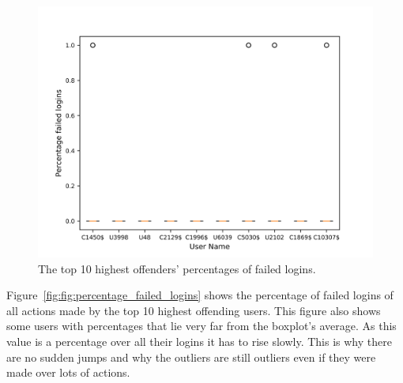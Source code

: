 \begin{figure}
	\begin{center}
		\includegraphics[scale=0.1]{evaluation/highest_offender_percentage_failed_logins}
	\end{center}
	\caption{The top 10 highest offenders' percentages of failed logins.~\label{fig:percentage_failed_logins}}
\end{figure}

Figure~\ref{fig:fig:percentage_failed_logins} shows the percentage of failed logins of all actions made by the top 10 highest offending users. This figure also shows some users with percentages that lie very far from the boxplot's average. As this value is a percentage over all their logins it has to rise slowly. This is why there are no sudden jumps and why the outliers are still outliers even if they were made over lots of actions.

